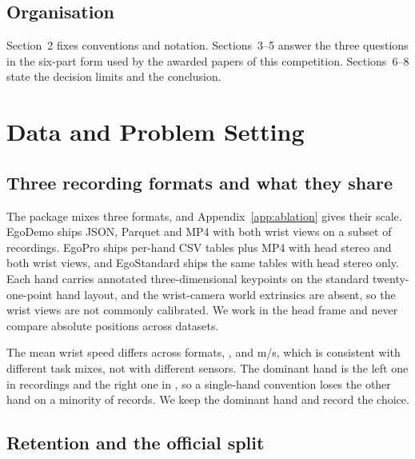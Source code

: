 \documentclass{swmcmthesis}
\begin{document}
\subsection{Organisation}

Section~2 fixes conventions and notation. Sections~3--5
answer the three questions in the six-part form used by the awarded papers of this
competition. Sections~6--8 state the decision limits and the conclusion.

\section{Data and Problem Setting}
\label{sec:data}

\subsection{Three recording formats and what they share}

The package mixes three formats, and Appendix~\ref{app:ablation} gives their scale.
EgoDemo ships JSON, Parquet and MP4 with both wrist views on a subset of recordings. EgoPro ships per-hand CSV tables plus MP4 with head stereo and both wrist views, and EgoStandard ships the same tables with head stereo only. Each hand carries
\slotNKeypoints{} annotated three-dimensional keypoints on the standard
twenty-one-point hand layout, and the wrist-camera world
extrinsics are absent, so the wrist views are not commonly calibrated. We work in the head frame and never compare absolute positions across datasets.




The mean wrist speed differs across formats, \slotDataSpeedDemo{},
\slotDataSpeedPro{} and \slotDataSpeedStd{} m/s, which is consistent with
different task mixes, not with different sensors. The dominant hand is the
left one in \slotDataDomLeft{} recordings and the right one in
\slotDataDomRight{}, so a single-hand convention loses the other hand on a
minority of records. We keep the dominant hand and record the choice.

\subsection{Retention and the official split}
\end{document}
